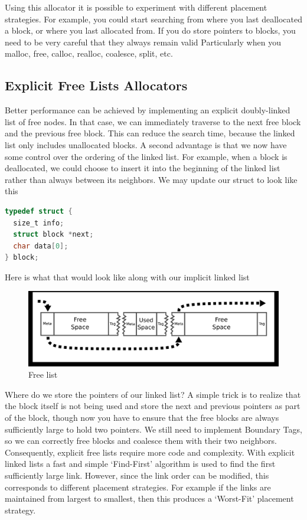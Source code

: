 Using this allocator it is possible to experiment with different placement strategies.
For example, you could start searching from where you last deallocated a block, or where you last allocated from.
If you do store pointers to blocks, you need to be very careful that they always remain valid
Particularly when you malloc, free, calloc, realloc, coalesce, split, etc.

\subsection{Explicit Free Lists Allocators}

Better performance can be achieved by implementing an explicit doubly-linked list of free nodes.
In that case, we can immediately traverse to the next free block and the previous free block.
This can reduce the search time, because the linked list only includes unallocated blocks.
A second advantage is that we now have some control over the ordering of the linked list.
For example, when a block is deallocated, we could choose to insert it into the beginning of the linked list rather than always between its neighbors.
We may update our struct to look like this

\begin{lstlisting}[language=C]
typedef struct {
  size_t info;
  struct block *next;
  char data[0];
} block;
\end{lstlisting}

Here is what that would look like along with our implicit linked list

\begin{figure}[H]
\centering
\includegraphics[width=.7\textwidth]{malloc/drawings/free_list.eps}
\caption{Free list}
\end{figure}


Where do we store the pointers of our linked list?
A simple trick is to realize that the block itself is not being used and store the next and previous pointers as part of the block, though now you have to ensure that the free blocks are always sufficiently large to hold two pointers.
We still need to implement Boundary Tags, so we can correctly free blocks and coalesce them with their two neighbors.
Consequently, explicit free lists require more code and complexity.
With explicit linked lists a fast and simple `Find-First' algorithm is used to find the first sufficiently large link.
However, since the link order can be modified, this corresponds to different placement strategies.
For example if the links are maintained from largest to smallest, then this produces a `Worst-Fit' placement strategy.

